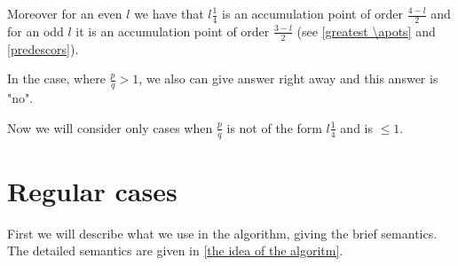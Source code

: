 Moreover for an even $l$ we have that $l\frac{1}{4}$ is an accumulation point of order 
$\frac{4-l}{2}$ 
and for an odd $l$ it is an accumulation point of order $\frac{3-l}{2}$ (see \ref{greatest \apots} 
and \ref{predescors}). 

In the case, where $\frac{p}{q} > 1$, we also can give answer right away and this answer is "no". 

Now we will consider only cases when $\frac{p}{q}$ is not of the form $l\frac{1}{4}$ and is 
$\leq 1$.
%
%
%
%
%
%
\section{Regular cases}
First we will describe what we use in the algorithm, giving the brief semantics. 
The detailed semantics are given in \ref{the idea of the algoritm}.
